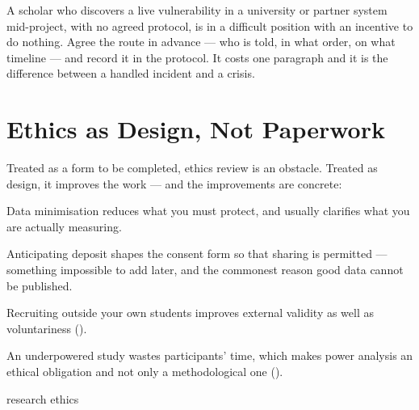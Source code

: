 \begin{alertbox}
A scholar who discovers a live vulnerability in a university or partner system
mid-project, with no agreed protocol, is in a difficult position with an
incentive to do nothing. Agree the route in advance --- who is told, in what
order, on what timeline --- and record it in the protocol. It costs one
paragraph and it is the difference between a handled incident and a crisis.
\end{alertbox}

\section{Ethics as Design, Not Paperwork}

\begin{conceptbox}
Treated as a form to be completed, ethics review is an obstacle. Treated as
design, it improves the work --- and the improvements are concrete:

\begin{tight}
  \item Data minimisation reduces what you must protect, and usually clarifies
    what you are actually measuring.
  \item Anticipating deposit shapes the consent form so that sharing is
    permitted --- something impossible to add later, and the commonest reason
    good data cannot be published.
  \item Recruiting outside your own students improves external validity as well
    as voluntariness ().
  \item An underpowered study wastes participants' time, which makes power
    analysis an ethical obligation and not only a methodological one
    ().
\end{tight}
\end{conceptbox}

\begin{traditions}{research ethics}
\end{traditions}

